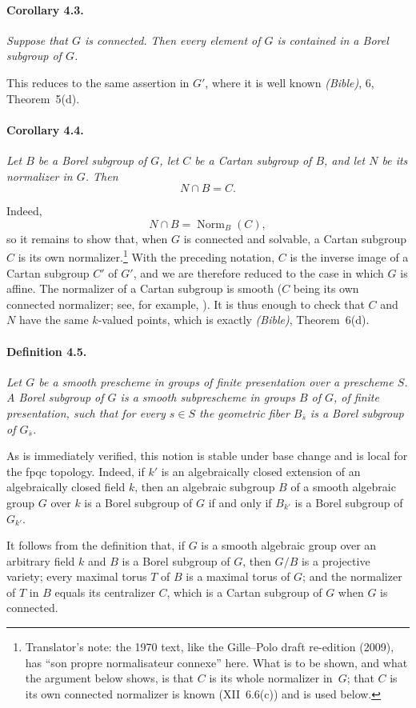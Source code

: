 \paragraph{\textbf{Corollary 4.3.}}
{\itshape Suppose that \(G\) is connected. Then every element of
\(G\) is contained in a Borel subgroup of \(G\).}

This reduces to the same assertion in \(G'\), where it is well known
\textup{\emph{(Bible)}, 6, Theorem~5\textup{(d)}}.

\paragraph{\textbf{Corollary 4.4.}}
{\itshape Let \(B\) be a Borel subgroup of \(G\), let \(C\) be a
Cartan subgroup of \(B\), and let \(N\) be its normalizer in \(G\).
Then
\[
  N\cap B=C.
\]}

Indeed,
\[
  N\cap B=\operatorname{Norm}_B(C),
\]
so it remains to show that, when \(G\) is connected and solvable, a
Cartan subgroup \(C\) is its own normalizer.\footnote{Translator's note: the 1970 text, like the Gille--Polo draft re-edition (2009), has ``son propre normalisateur connexe'' here. What is to be shown, and what the argument below shows, is that \(C\) is its whole normalizer in~\(G\); that \(C\) is its own connected normalizer is known \textup{(XII~6.6\textup{(c)})} and is used below.} With the
preceding notation, \(C\) is the inverse image of a Cartan subgroup
\(C'\) of \(G'\), and we are therefore reduced to the case in which
\(G\) is affine. The normalizer of a Cartan subgroup is smooth
\textup{(\(C\) being its own connected normalizer; see, for example,
\textup{})}. It is thus enough to check that \(C\) and
\(N\) have the same \(k\)-valued points, which is exactly
\textup{\emph{(Bible)}, Theorem~6\textup{(d)}}.

\paragraph{\textbf{Definition 4.5.}}
{\itshape Let \(G\) be a smooth prescheme in groups of finite
presentation over a prescheme \(S\). A \emph{Borel subgroup} of
\(G\) is a smooth subprescheme in groups \(B\) of \(G\), of finite
presentation, such that for every \(s\in S\) the geometric fiber
\(B_{\bar s}\) is a Borel subgroup of \(G_{\bar s}\).}

As is immediately verified, this notion is stable under base change
and is local for the fpqc topology. Indeed, if \(k'\) is an
algebraically closed extension of an algebraically closed field
\(k\), then an algebraic subgroup \(B\) of a smooth algebraic group
\(G\) over \(k\) is a Borel subgroup of \(G\) if and only if
\(B_{k'}\) is a Borel subgroup of \(G_{k'}\).

It follows from the definition that, if \(G\) is a smooth algebraic
group over an arbitrary field \(k\) and \(B\) is a Borel subgroup
of \(G\), then \(G/B\) is a projective variety; every maximal torus
\(T\) of \(B\) is a maximal torus of \(G\); and the normalizer of
\(T\) in \(B\) equals its centralizer \(C\), which is a Cartan
subgroup of \(G\) when \(G\) is connected.
